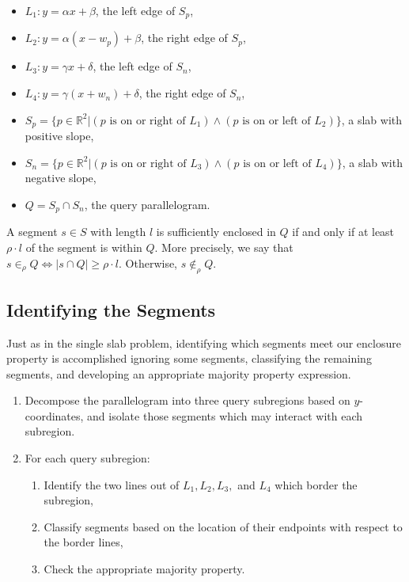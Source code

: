 \begin{itemize}
 \item $L_1 : y = \alpha x + \beta$, the left edge of $S_p$,

 \item $L_2 : y = \alpha (x - w_p) + \beta$, the right edge of $S_p$,

 \item $L_3 : y = \gamma x + \delta$, the left edge of $S_n$,

 \item $L_4 : y = \gamma (x + w_n) + \delta$, the right edge of $S_n$,

 \item $S_p = \{ p \in \mathbb{R}^2 | (p \text{ is on or right of } L_1) \wedge (p \text{ is on or left of } L_2) \}$, a slab with positive slope,

 \item $S_n = \{ p \in \mathbb{R}^2 | (p \text{ is on or right of } L_3) \wedge (p \text{ is on or left of } L_4) \}$, a slab with negative slope,

 \item $Q = S_p \cap S_n$, the query parallelogram.

\end{itemize}

A segment $s \in S$ with length $l$ is sufficiently enclosed in $Q$ if and only if at least $\rho \cdot l$ of the segment is within $Q$. More precisely, we say that $s \in_\rho Q \Leftrightarrow |s \cap Q| \geq \rho \cdot l$. Otherwise, $s \not \in_\rho Q$.


\subsection{Identifying the Segments}
\label{:slabs:two:approach}

Just as in the single slab problem, identifying which segments meet our enclosure property is accomplished ignoring some segments, classifying the remaining segments, and developing an appropriate majority property expression.

\begin{enumerate}
 \item Decompose the parallelogram into three query subregions based on $y$-coordinates, and isolate those segments which may interact with each subregion.

 \item For each query subregion:
 \begin{enumerate}
  \item Identify the two lines out of $L_1, L_2, L_3,$ and $L_4$ which border the subregion,
  \item Classify segments based on the location of their endpoints with respect to the border lines,
  \item Check the appropriate majority property.
 \end{enumerate}
\end{enumerate}

